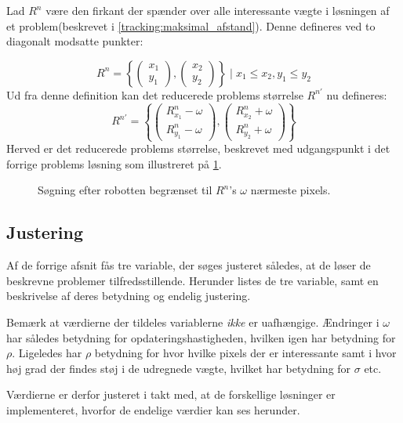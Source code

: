 Lad $R^n$ være den firkant der spænder over alle interessante vægte i løsningen af et problem(beskrevet i \cref{tracking:maksimal_afstand}).
Denne defineres ved to diagonalt modsatte punkter:
{
\newcommand{\cvec}[2]{\begin{pmatrix}#1\\#2\end{pmatrix}}

$$R^n = \left\{\cvec{x_1}{y_1}, \cvec{x_2}{y_2}\right\} \mid x_1 \leq x_2 , y_1 \leq y_2$$
Ud fra denne definition kan det reducerede problems størrelse $R^{n'}$ nu defineres:
\begin{equation}\label{tracking:eq:inflate}
R^{n'} = \left\{
	\cvec{R^n_{x_1}-\omega}{R^n_{y_1}-\omega},
	\cvec{R^n_{x_2}+\omega}{R^n_{y_2}+\omega}
\right\}
\end{equation}
Herved er det reducerede problems størrelse, beskrevet med udgangspunkt i det forrige problems løsning som illustreret på \cref{tracking:reduction}.
}

\begin{figure}
\centering

\caption{Søgning efter robotten begrænset til $R^n$'s $\omega$ nærmeste pixels.}
\label{tracking:reduction}
\end{figure}

\subsection{Justering}\label{tracking:adjust}
Af de forrige afsnit fås tre variable, der søges justeret således, at de løser de beskrevne problemer tilfredsstillende.
Herunder listes de tre variable, samt en beskrivelse af deres betydning og endelig justering.

Bemærk at værdierne der tildeles variablerne \emph{ikke} er uafhængige.
Ændringer i $\omega$ har således betydning for opdateringshastigheden, hvilken igen har betydning for $\rho$.
Ligeledes har $\rho$ betydning for hvor hvilke pixels der er interessante samt i hvor høj grad der findes støj i de udregnede vægte, hvilket har betydning for $\sigma$ etc.

Værdierne er derfor justeret i takt med, at de forskellige løsninger er implementeret, hvorfor de endelige værdier kan ses herunder.

